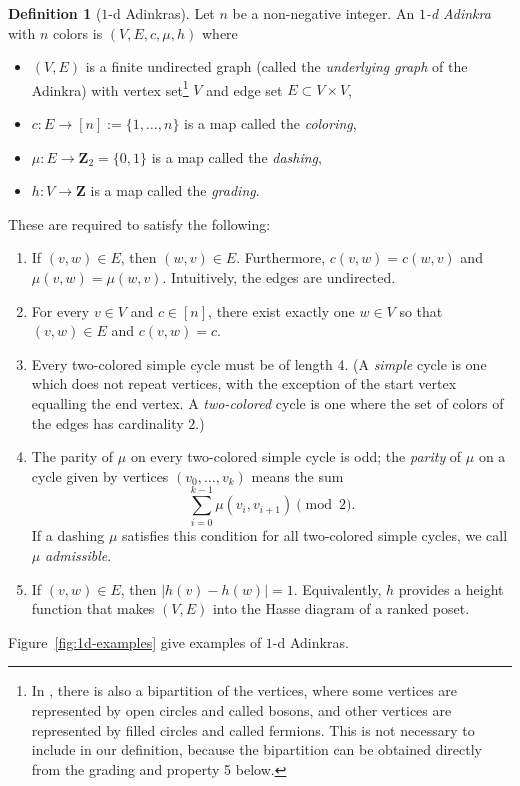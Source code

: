 \documentclass[12pt,twoside,singlespace]{article}
\numberwithin{equation}{section}
\theoremstyle{definition}
\newtheorem{definition}[equation]{Definition}
\newcommand{\ZZ}{\mathbf{Z}}
\begin{document}
\begin{definition}[$1$-d Adinkras]
Let $n$ be a non-negative integer.  An \emph{$1$-d Adinkra} with $n$ colors is $(V,E,c,\mu,h)$ where
\begin{itemize}
\item $(V,E)$ is a finite undirected graph (called the \emph{underlying graph} of the Adinkra) with vertex set\footnote{In \cite{d2l:first,d2l:graph-theoretic}, there is also a bipartition of the vertices, where some vertices are represented by open circles and called bosons, and other vertices are represented by filled circles and called fermions.  This is not necessary to include in our definition, because the bipartition can be obtained directly from the grading and property 5 below.}
 $V$ and edge set $E\subset V\times V$,
\item $c:E\to [n] := \{1,\ldots,n\}$ is a map called the \emph{coloring},
\item $\mu:E\to \ZZ_2=\{0,1\}$ is a map called the \emph{dashing},
\item $h:V\to\ZZ$ is a map called the \emph{grading}.
\end{itemize}

These are required to satisfy the following:
\begin{enumerate}
\item If $(v,w)\in E$, then $(w,v)\in E$.  Furthermore, $c(v,w)=c(w,v)$ and $\mu(v,w)=\mu(w,v)$.  Intuitively, the edges are undirected.
\item For every $v\in V$ and $c\in [n]$, there exist exactly one $w\in V$ so that $(v,w)\in E$ and $c(v,w)=c$.
\item Every two-colored simple cycle must be of length 4.  (A \emph{simple} cycle is one which does not repeat vertices, with the exception of the start vertex equalling the end vertex.  A \emph{two-colored} cycle is one where the set of colors of the edges has cardinality $2$.)
\item The parity of $\mu$ on every two-colored simple cycle is odd; the \emph{parity} of $\mu$ on a cycle given by vertices $(v_0,\ldots,v_k)$ means the sum
\[\sum_{i=0}^{k-1}\mu(v_i,v_{i+1})\pmod{2}.\]
If a dashing $\mu$ satisfies this condition for all two-colored simple cycles, we call $\mu$ \emph{admissible}.
\item If $(v,w)\in E$, then $|h(v)-h(w)|=1$. Equivalently, $h$ provides a height function that makes $(V,E)$ into the Hasse diagram of a ranked poset.
\end{enumerate}

Figure~\ref{fig:1d-examples} give examples of $1$-d Adinkras.
\end{definition}
\end{document}
